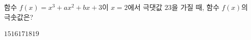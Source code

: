 함수 $f(x)=x^3+ax^2+bx+3$이 $x=2$에서 극댓값 $23$을 가질 때, 함수 $f(x)$의 극솟값은? 
\begin{choices32}{$15$}{$16$}{$17$}{$18$}{$19$}\end{choices32}
